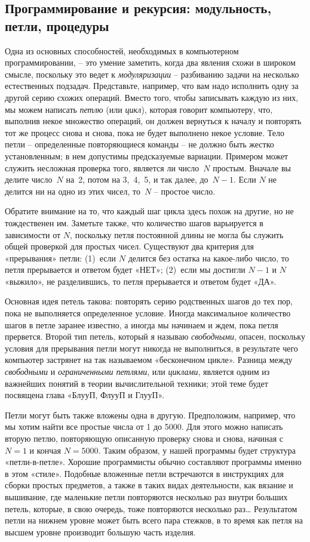 \documentclass[../main.tex]{subfiles}
\begin{document}
\subsection{Программирование и рекурсия: модульность, петли, процедуры}

Одна из основных способностей, необходимых в компьютерном программировании, \--- это умение заметить, когда два явления схожи в широком смысле, поскольку это ведет к \emph{модуляризации} \--- разбиванию задачи на несколько естественных подзадач. Представьте, например, что вам надо исполнить одну за другой серию схожих операций. Вместо того, чтобы записывать каждую из них, мы можем написать \emph{петлю} (или \emph{цикл}), которая говорит компьютеру, что, выполнив некое множество операций, он должен вернуться к началу и повторять тот же процесс снова и снова, пока не будет выполнено некое условие. Тело петли \--- определенные повторяющиеся команды \--- не должно быть жестко установленным; в нем допустимы предсказуемые вариации. Примером может служить несложная проверка того, является ли число~$N$ простым. Вначале вы делите число~$N$ на~2, потом на 3,~4,~5, и так далее, до~$N-1$. Если $N$ не делится ни на одно из этих чисел, то~$N$ \--- простое число.

Обратите внимание на то, что каждый шаг цикла здесь похож на другие, но не тождественен им. Заметьте также, что количество шагов варьируется в зависимости от $N$, поскольку петля постоянной длины не могла бы служить общей проверкой для простых чисел. Существуют два критерия для «прерывания» петли: (1)~если $N$ делится без остатка на какое-либо число, то петля прерывается и ответом будет «НЕТ»; (2)~если мы достигли $N-1$ и $N$ «выжило», не разделившись, то петля прерывается и ответом будет «ДА».

Основная идея петель такова: повторять серию родственных шагов до тех пор, пока не выполняется определенное условие. Иногда максимальное количество шагов в петле заранее известно, а иногда мы начинаем и ждем, пока петля прервется. Второй тип петель, который я называю \emph{свободными}, опасен, поскольку условия для прерывания петли могут никогда не выполниться, в результате чего компьютер застрянет на так называемом «бесконечном цикле». Разница между \emph{свободными} и \emph{ограниченными петлями}, или \emph{циклами}, является одним из важнейших понятий в теории вычислительной техники; этой теме будет посвящена глава «БлууП, ФлууП и ГлууП».

Петли могут быть также вложены одна в другую. Предположим, например, что мы хотим найти все простые числа от 1 до 5000. Для этого можно написать вторую петлю, повторяющую описанную проверку снова и снова, начиная с $N=1$ и кончая $N=5000$. Таким образом, у нашей программы будет структура «петли-в-петле». Хорошие программисты обычно составляют программы именно в этом «стиле». Подобные вложенные петли встречаются в инструкциях для сборки простых предметов, а также в таких видах деятельности, как вязание и вышивание, где маленькие петли повторяются несколько раз внутри больших петель, которые, в свою очередь, тоже повторяются несколько раз\ldots{} Результатом петли на нижнем уровне может быть всего пара стежков, в то время как петля на высшем уровне производит большую часть изделия.
\end{document}
